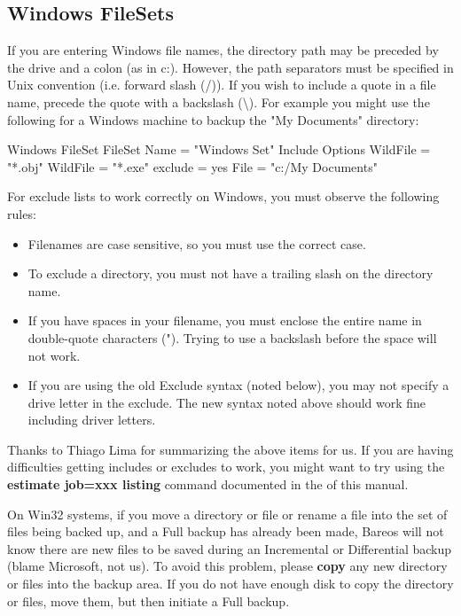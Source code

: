 \subsection{Windows FileSets}
\label{win32}
If you are entering Windows file names, the directory path may be preceded by
the drive and a colon (as in c:). However, the path separators must be
specified in Unix convention (i.e. forward slash (/)). If you wish to include
a quote in a file name, precede the quote with a backslash
(\textbackslash{}). For example you might use the following
for a Windows machine to backup the "My Documents" directory:

\begin{bconfig}{Windows FileSet}
FileSet {
  Name = "Windows Set"
  Include {
    Options {
       WildFile = "*.obj"
       WildFile = "*.exe"
       exclude = yes
     }
     File = "c:/My Documents"
  }
}
\end{bconfig}

For exclude lists to work correctly on Windows, you must observe the following
rules:

\begin{itemize}
\item Filenames are case sensitive, so you must use the correct case.
\item To exclude a directory, you must not have a trailing slash on the
   directory name.
\item If you have spaces in your filename, you must enclose the entire name
   in double-quote characters ("). Trying to use a backslash before  the space
   will not work.
\item If you are using the old Exclude syntax (noted below), you may not
   specify a drive letter in the exclude.  The new syntax noted above
   should work fine including driver letters.
\end{itemize}

Thanks to Thiago Lima for summarizing the above items for us. If you are
having difficulties getting includes or excludes to work, you might want to
try using the {\bf estimate job=xxx listing} command documented in the
 of this manual.

On Win32 systems, if you move a directory or file or rename a file into the
set of files being backed up, and a Full backup has already been made, Bareos
will not know there are new files to be saved during an Incremental or
Differential backup (blame Microsoft, not us). To avoid this problem, please
{\bf copy} any new directory or files into the backup area. If you do not have
enough disk to copy the directory or files, move them, but then initiate a
Full backup.


